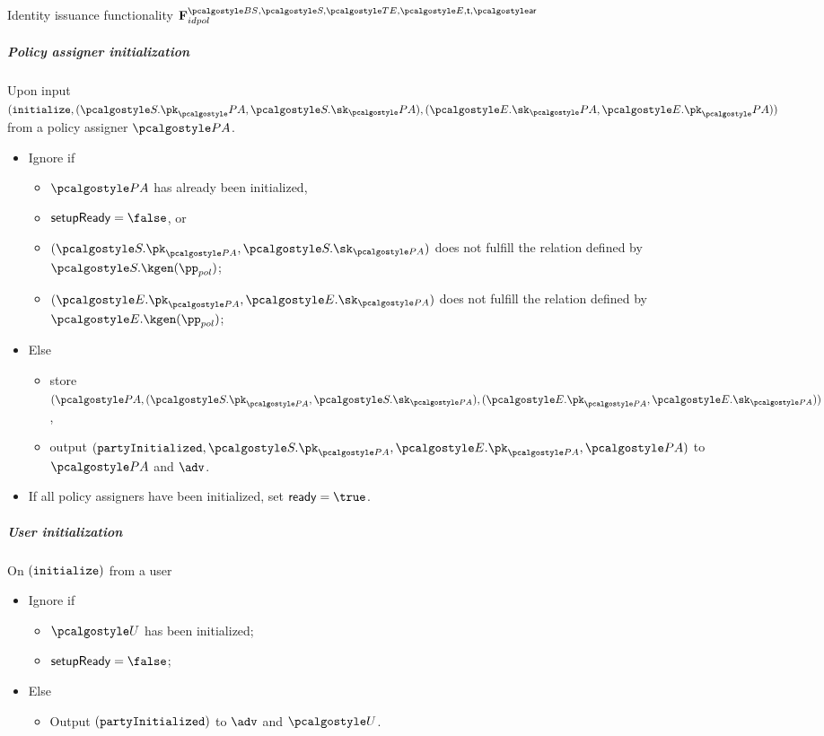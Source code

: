 \documentclass[runningheads,10pt]{llncs}
\numberwithin{equation}{section}
\begin{document}
\begin{funcbox}{Identity issuance functionality
    $\func{idpol}^{\BSIG, \SIG, \TENC, \ENC, \thresholdar, \noofar}$}
  \subparagraph{Policy assigner initialization} Upon input
  $(\initialize, (\SIG.\pk_\polas, \SIG.\sk_\polas), (\ENC.\sk_\polas,
  \ENC.\pk_\polas) )$ from a policy assigner $\polas$.
  \begin{itemize}
\item Ignore if
  \begin{itemize}
  \item $\polas$ has already been initialized,
  \item $\flag{setupReady} = \false$, or
  \item $(\SIG.\pk_{\polas}, \SIG.\sk_{\polas})$ does not fulfill the relation
    defined by $\SIG.\kgen(\pp_{pol})$;
  \item $(\ENC.\pk_{\polas}, \ENC.\sk_{\polas})$ does not fulfill the relation
    defined by $\ENC.\kgen(\pp_{pol})$;
  \end{itemize}
\item Else
  \begin{itemize}
  \item store $(\polas, (\SIG.\pk_{\polas}, \SIG.\sk_{\polas}), (\ENC.\pk_{\polas}, \ENC.\sk_{\polas}) )$,
  \item output $(\partyInitialized, \SIG.\pk_{\polas}, \ENC.\pk_{\polas}, \polas)$ to
    $\polas$ and $\adv$.
  \end{itemize}
\item If all policy assigners have been initialized, set $\flag{ready} =
\true$.
\end{itemize}

\subparagraph{User initialization}
On $(\mathtt{initialize})$ from a user
\begin{itemize}
\item Ignore if
   \begin{itemize}
   \item $\user$ has been initialized;
   \item $\flag{setupReady} = \false$;
   \end{itemize}
 \item Else
   \begin{itemize}
   \item Output $(\mathtt{partyInitialized})$ to $\adv$ and $\user$.
   \end{itemize}
 \end{itemize}


\end{funcbox}
\end{document}
